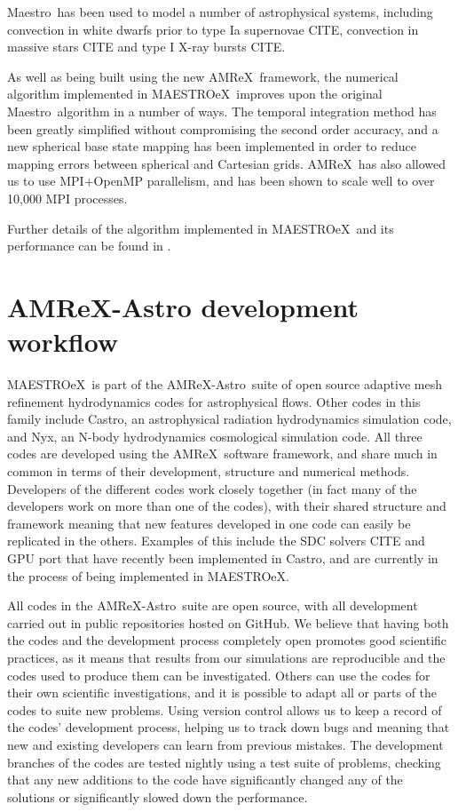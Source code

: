 \documentclass[a4paper]{jpconf}
\newcommand{\maestro}{{\sffamily Maestro}}
\newcommand{\maestroex}{{\sffamily MAESTROeX}}
\newcommand{\castro}{{\sffamily Castro}}
\newcommand{\nyx}{{\sffamily Nyx}}
\newcommand{\amrex}{{\sffamily AMReX}}
\newcommand{\amrexastro}{{\sffamily AMReX-Astro}}
\newcommand{\MarginPar}[1]{\marginpar{\vskip-\baselineskip\raggedright\tiny\sffamily\hrule\smallskip{\color{red}#1}\par\smallskip\hrule}}
\begin{document}
\maestro~has been used to model a number of astrophysical systems, including convection in white dwarfs prior to type Ia supernovae CITE, convection in massive stars CITE and type I X-ray bursts CITE. 

As well as being built using the new \amrex~framework, the numerical algorithm implemented in \maestroex~improves upon the original \maestro~algorithm in a number of ways. The temporal integration method has been greatly simplified without compromising the second order accuracy, and a new spherical base state mapping has been implemented in order to reduce mapping errors between spherical and Cartesian grids. \amrex~has also allowed us to use MPI+OpenMP parallelism, and has been shown to scale well to over 10,000 MPI processes. 

Further details of the algorithm implemented in \maestroex~and its performance can be found in \cite{Fan2019}.



\section{AMReX-Astro development workflow} \label{sec:workflow}


\maestroex~is part of the \amrexastro~suite of open source adaptive mesh refinement hydrodynamics codes for astrophysical flows. Other codes in this family include \castro, an astrophysical radiation hydrodynamics simulation code, and \nyx, an N-body hydrodynamics cosmological simulation code. All three codes are developed using the \amrex~software framework, and share much in common in terms of their development, structure and numerical methods. Developers of the different codes work closely together (in fact many of the developers work on more than one of the codes), with their shared structure and framework meaning that new features developed in one code can easily be replicated in the others. Examples of this include the SDC solvers CITE and GPU port that have recently been implemented in \castro, and are currently in the process of being implemented in \maestroex. 

All codes in the \amrexastro~suite are open source, with all development carried out in public repositories hosted on GitHub. We believe that having both the codes and the development process completely open promotes good scientific practices, as it means that results from our simulations are reproducible and the codes used to produce them can be investigated.\MarginPar{I feel like there is a better word here than investigated} Others can use the codes for their own scientific investigations, and it is possible to adapt all or parts of the codes to suite new problems. Using version control allows us to keep a record of the codes' development process, helping us to track down bugs and meaning that new and existing developers can learn from previous mistakes. The development branches of the codes are tested nightly using a test suite of problems, checking that any new additions to the code have significantly changed any of the solutions or significantly slowed down the performance.
\end{document}
